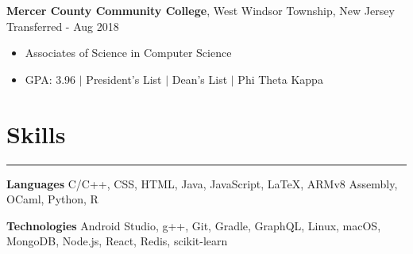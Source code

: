 \documentclass[10pt]{article}
\newcommand{\resumesection}[1]{\vspace{-0.2cm}\section*{#1}\vspace{-0.2cm}\hrule\vspace{0.2cm}}
\begin{document}
\textbf{Mercer County Community College}, West Windsor Township, New Jersey \hfill Transferred - Aug 2018
\begin{itemize}
	\item[] Associates of Science in Computer Science
	\item[] GPA: 3.96 $\vert$ President's List $\vert$ Dean's List $\vert$ Phi Theta Kappa
\end{itemize}


\resumesection{Skills}
\textbf{Languages} C/C++, CSS, HTML, Java, JavaScript, \LaTeX, ARMv8 Assembly, OCaml, Python, R


\textbf{Technologies} Android Studio, g++, Git, Gradle, GraphQL, Linux, macOS, MongoDB, Node.js, React, Redis, scikit-learn


%


\end{document}
